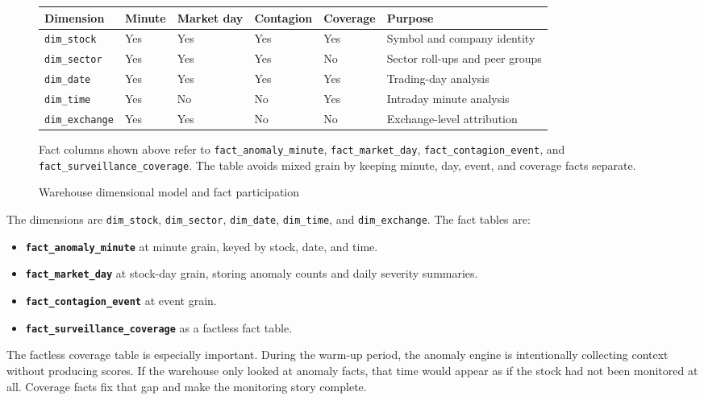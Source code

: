 \documentclass[11pt,a4paper]{article}
\begin{document}
\begin{figure}[H]
\centering
\small
\begin{tabularx}{\textwidth}{L{0.18\textwidth}>{\centering\arraybackslash}p{0.10\textwidth}>{\centering\arraybackslash}p{0.12\textwidth}>{\centering\arraybackslash}p{0.12\textwidth}>{\centering\arraybackslash}p{0.11\textwidth}Y}
\toprule
\textbf{Dimension} &
\textbf{Minute} &
\textbf{Market day} &
\textbf{Contagion} &
\textbf{Coverage} &
\textbf{Purpose} \\
\midrule
\texttt{dim\_stock} & Yes & Yes & Yes & Yes & Symbol and company identity \\
\texttt{dim\_sector} & Yes & Yes & Yes & No & Sector roll-ups and peer groups \\
\texttt{dim\_date} & Yes & Yes & Yes & Yes & Trading-day analysis \\
\texttt{dim\_time} & Yes & No & No & Yes & Intraday minute analysis \\
\texttt{dim\_exchange} & Yes & Yes & No & No & Exchange-level attribution \\
\bottomrule
\end{tabularx}

\vspace{0.45em}
\footnotesize
Fact columns shown above refer to \texttt{fact\_anomaly\_minute}, \texttt{fact\_market\_day}, \texttt{fact\_contagion\_event}, and \texttt{fact\_surveillance\_coverage}. The table avoids mixed grain by keeping minute, day, event, and coverage facts separate.
\caption{Warehouse dimensional model and fact participation}
\label{fig:starschema}
\end{figure}

The dimensions are \texttt{dim\_stock}, \texttt{dim\_sector}, \texttt{dim\_date}, \texttt{dim\_time}, and \texttt{dim\_exchange}. The fact tables are:
\begin{itemize}
    \item \textbf{\texttt{fact\_anomaly\_minute}} at minute grain, keyed by stock, date, and time.
    \item \textbf{\texttt{fact\_market\_day}} at stock-day grain, storing anomaly counts and daily severity summaries.
    \item \textbf{\texttt{fact\_contagion\_event}} at event grain.
    \item \textbf{\texttt{fact\_surveillance\_coverage}} as a factless fact table.
\end{itemize}

The factless coverage table is especially important. During the warm-up period, the anomaly engine is intentionally collecting context without producing scores. If the warehouse only looked at anomaly facts, that time would appear as if the stock had not been monitored at all. Coverage facts fix that gap and make the monitoring story complete.
\end{document}
